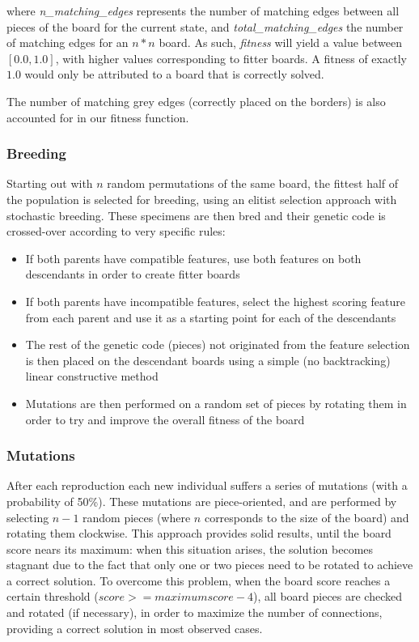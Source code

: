 \documentclass{llncs}
\begin{document}
where \textit{n\_matching\_edges} represents the number of matching edges between all pieces of the board for the current state, and \textit{total\_matching\_edges} the number of matching edges for an $n*n$ board. As such, \textit{fitness} will yield a value between $[0.0, 1.0]$, with higher values corresponding to fitter boards. A fitness of exactly $1.0$ would only be attributed to a board that is correctly solved.

The number of matching grey edges (correctly placed on the borders) is also accounted for in our fitness function.

\subsubsection{Breeding}

Starting out with $n$ random permutations of the same board, the fittest half of the population is selected for breeding, using an elitist selection approach with stochastic breeding. These specimens are then bred and their genetic code is crossed-over according to very specific rules:

\begin{itemize}
  \item If both parents have compatible features, use both features on both descendants in order to create fitter boards
  \item If both parents have incompatible features, select the highest scoring feature from each parent and use it as a starting point for each of the descendants
  \item The rest of the genetic code (pieces) not originated from the feature selection is then placed on the descendant boards using a simple (no backtracking) linear constructive method
  \item Mutations are then performed on a random set of pieces by rotating them in order to try and improve the overall fitness of the board
\end{itemize}

\subsubsection{Mutations}\label{sec:mutations}

After each reproduction each new individual suffers a series of mutations (with a probability of 50\%). These mutations are piece-oriented, and are performed by selecting $n-1$ random pieces (where $n$ corresponds to the size of the board) and rotating them clockwise. This approach provides solid results, until the board score nears its maximum: when this situation arises, the solution becomes stagnant due to the fact that only one or two pieces need to be rotated to achieve a correct solution. To overcome this problem, when the board score reaches a certain threshold ($score >= maximum score - 4$), all board pieces are checked and rotated (if necessary), in order to maximize the number of connections, providing a correct solution in most observed cases.
\end{document}
